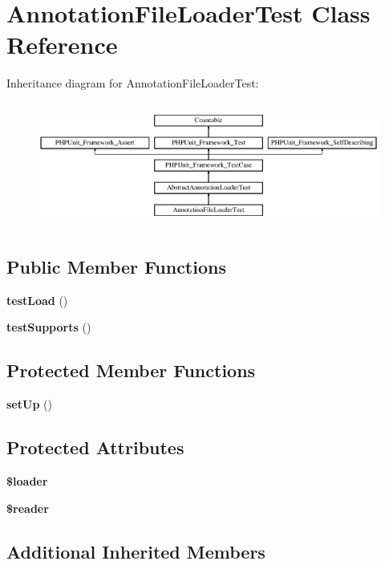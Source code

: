 \section{Annotation\+File\+Loader\+Test Class Reference}
\label{class_symfony_1_1_component_1_1_routing_1_1_tests_1_1_loader_1_1_annotation_file_loader_test}
Inheritance diagram for Annotation\+File\+Loader\+Test\+:\begin{figure}[H]
\begin{center}
\leavevmode
\includegraphics[height=4.129793cm]{class_symfony_1_1_component_1_1_routing_1_1_tests_1_1_loader_1_1_annotation_file_loader_test}
\end{center}
\end{figure}
\subsection*{Public Member Functions}
\begin{DoxyCompactItemize}
\item 
{\bf test\+Load} ()
\item 
{\bf test\+Supports} ()
\end{DoxyCompactItemize}
\subsection*{Protected Member Functions}
\begin{DoxyCompactItemize}
\item 
{\bf set\+Up} ()
\end{DoxyCompactItemize}
\subsection*{Protected Attributes}
\begin{DoxyCompactItemize}
\item 
{\bf \$loader}
\item 
{\bf \$reader}
\end{DoxyCompactItemize}
\subsection*{Additional Inherited Members}


